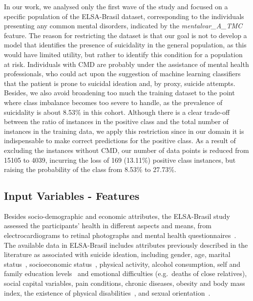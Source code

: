 In our work, we analysed only the first wave of the study and focused on a specific population of the ELSA-Brasil dataset, corresponding to the individuals presenting any common mental disorders, indicated by the \textit{mentalvar\_A\_TMC} feature.
The reason for restricting the dataset is that our goal is not to develop a model that identifies the presence of suicidality in the general population, as this would have limited utility, but rather to identify this condition for a population at risk.
Individuals with CMD are probably under the assistance of mental health professionals, who could act upon the suggestion of machine learning classifiers that the patient is prone to suicidal ideation and, by proxy, suicide attempts.
Besides, we also avoid broadening too much the training dataset to the point where class imbalance becomes too severe to handle, as the prevalence of suicidality is about 8.53\% in this cohort.
Although there is a clear trade-off between the ratio of instances in the positive class and the total number of instances in the training data, we apply this restriction since in our domain it is indispensable to make correct predictions for the positive class.
As a result of excluding the instances without CMD, our number of data points is reduced from 15105 to 4039, incurring the loss of 169 (13.11\%) positive class instances, but raising the probability of the class from 8.53\% to 27.73\%.

\subsection{Input Variables - Features}\label{subsec:features}

Besides socio-demographic and economic attributes, the ELSA-Brasil study assessed the participants' health in different aspects and means, from electrocardiograms to retinal photographs and mental health questionnaires~\cite{Schmidt2015}.
The available data in ELSA-Brasil includes attributes previously described in the literature as associated with suicide ideation, including gender, age, marital status~\cite{Nock2008}, socioeconomic status~\cite{Gunnell2009, Meltzer2012, Meneghel2004}, physical activity, alcohol consumption, self and family education levels~\cite{Souza2010a} and emotional difficulties (e.g.\ deaths of close relatives), social capital variables, pain conditions, chronic diseases, obesity and body mass index, the existence of physical disabilities~\cite{Meltzer2012a}, and sexual orientation~\cite{Silenzio2007}.

